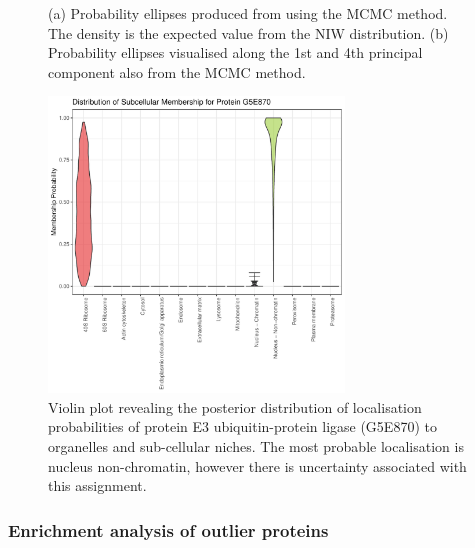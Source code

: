 \documentclass[12pt,english]{article}\usepackage[]{graphicx}\usepackage[]{color}
\newenvironment{knitrout}{}{} %
\begin{document}
\begin{figure}[ht]
\begin{subfigure}[t]{0.45\textwidth}
\begin{knitrout}
\end{knitrout}
        \centering
        \caption{}
\end{subfigure}
  \centering
  \caption{(a) Probability ellipses produced from using the MCMC
    method.  The density is the expected value from the NIW
    distribution. (b) Probability ellipses visualised along the 1st
    and 4th principal component also from the MCMC method.}
\label{figure::pcaellipseMCMC}
\end{figure}

\begin{figure}[ht]
\centering
\begin{knitrout}
\color{fgcolor}

{\centering \includegraphics[width=0.7\textwidth]{figure/violin-G5E870-1} 

}



\end{knitrout}

\caption{Violin plot revealing the posterior distribution of
  localisation probabilities of protein E3 ubiquitin-protein ligase
  (G5E870) to organelles and sub-cellular niches.  The most probable
  localisation is nucleus non-chromatin, however there is uncertainty
  associated with this assignment.}
\label{fig:G5E870}
\end{figure}

\clearpage

\subsubsection*{Enrichment analysis of outlier proteins}
\end{document}
